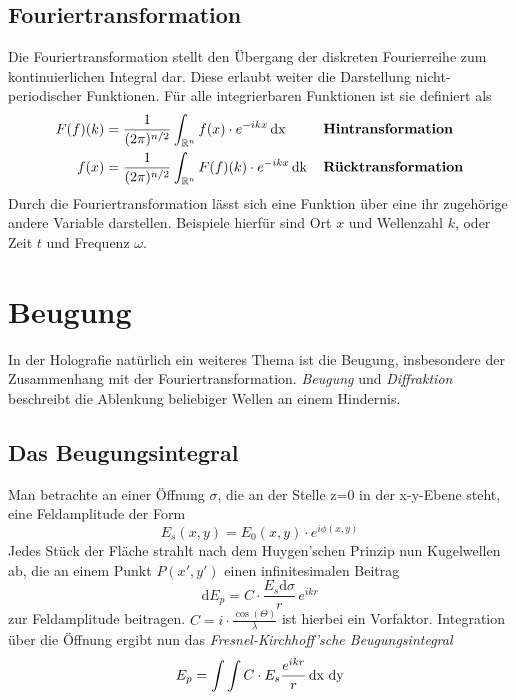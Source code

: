         \subsection*{Fouriertransformation}
Die Fouriertransformation stellt den Übergang der diskreten Fourierreihe zum
kontinuierlichen Integral dar. Diese erlaubt weiter die Darstellung nicht-periodischer
Funktionen. Für alle integrierbaren Funktionen ist sie definiert als
                \begin{align*}
                   F(f)(k) &= \frac{1}{(2\pi)^{n/2}} \int_{\mathbb{R}^n}
                    f(x) \cdot e^{-ikx} \,\text{dx}\, & &\text{\textbf{Hintransformation}}\\
                    f(x) &= \frac{1}{(2\pi)^{n/2}} \int_{\mathbb{R}^n}
                    F(f)(k) \cdot e^{-ikx} \,\text{dk}\, & &\text{\textbf{Rücktransformation}}
                \end{align*}
Durch die Fouriertransformation lässt sich eine Funktion über eine ihr zugehörige
andere Variable darstellen. Beispiele hierfür sind Ort $x$ und Wellenzahl $k$,
oder Zeit $t$ und Frequenz $\omega$.

    \section{Beugung}
In der Holografie natürlich ein weiteres Thema ist die Beugung, insbesondere der 
Zusammenhang mit der Fouriertransformation. \emph{Beugung} und \emph{Diffraktion} 
beschreibt die Ablenkung beliebiger Wellen an einem Hindernis.

        \subsection*{Das Beugungsintegral}
Man betrachte an einer Öffnung $\sigma$, die an der Stelle z=0 in der x-y-Ebene steht,
 eine Feldamplitude der Form
    \[
        E_s (x,y) = E_0 (x,y) \cdot e^{i\phi(x,y)}
    \]
Jedes Stück der Fläche strahlt nach dem Huygen'schen Prinzip nun Kugelwellen ab, 
die an einem Punkt $P(x',y')$ einen infinitesimalen Beitrag 
    \[
        \text{d}E_p = C \cdot \frac{E_s \text{d}\sigma}{r}\, e^{ikr}
    \]
zur Feldamplitude beitragen. $\displaystyle C = i \cdot \frac{\cos(\Theta)}{\lambda}$
ist hierbei ein Vorfaktor. Integration über die Öffnung ergibt nun das 
\emph{Fresnel-Kirchhoff'sche Beugungsintegral}
    \[
        E_p = \int \int C \cdot E_s \frac{e^{ikr}}{r} \,\text{dx}\, \, \text{dy}
    \]

